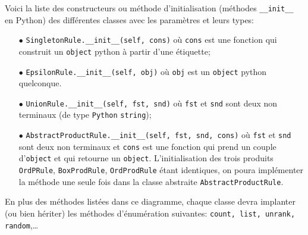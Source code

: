 \documentclass[11pt]{article}
\newcommand{\Python}{\texttt{Python}\xspace}
\begin{document}
\begin{center}
\end{center}
\smallskip



Voici la liste des constructeurs ou méthode d'initialisation (méthodes
\verb+__init__+ en Python) des différentes classes avec les paramètres et
leurs types:
\medskip

\begin{itemize}
\item[$\bullet$] \verb+SingletonRule.__init__(self, cons)+ où \texttt{cons} est
  une fonction qui construit un \texttt{object} python à partir d'une
  étiquette;
\medskip
\item[$\bullet$] \verb+EpsilonRule.__init__(self, obj)+ où \texttt{obj} est un
  \texttt{object} python quelconque.
\medskip
\item[$\bullet$] \verb+UnionRule.__init__(self, fst, snd)+ où \texttt{fst} et
  \texttt{snd} sont deux non terminaux (de type \Python{} \texttt{string});
\medskip
\item[$\bullet$] \verb+AbstractProductRule.__init__(self, fst, snd, cons)+ où
  \texttt{fst} et \texttt{snd} sont deux non terminaux et \texttt{cons} est
  une fonction qui prend un couple d'\texttt{object} et qui retourne un
  \texttt{object}. L'initialisation des trois produits \verb+OrdPRule+,
  \verb+BoxProdRule+, \verb+OrdProdRule+ étant
  identiques, on poura implémenter la méthode une seule fois dans la classe
  abstraite \verb+AbstractProductRule+.
\medskip
\end{itemize}
En plus des méthodes listées dans ce diagramme, chaque classe devra implanter
(ou bien hériter) les méthodes d'énumération suivantes: \texttt{count, list,
  unrank, random},\dots
\end{document}
